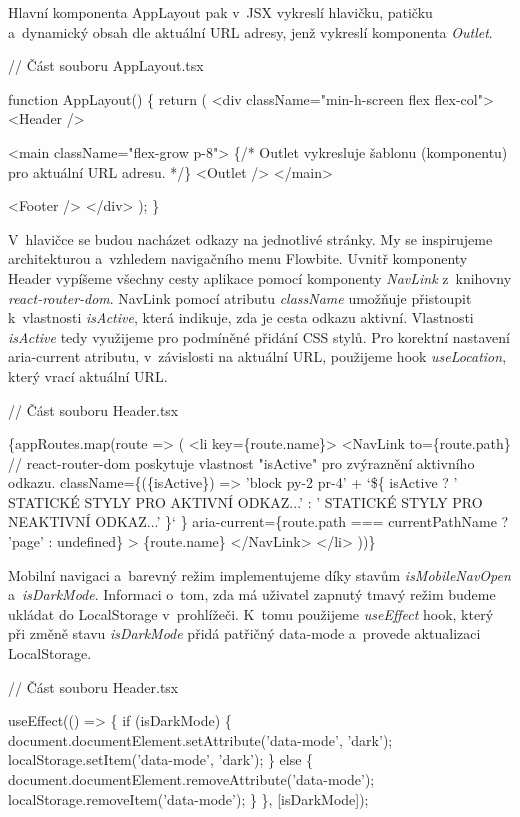 Hlavní komponenta AppLayout pak v~JSX vykreslí hlavičku, patičku a~dynamický obsah dle aktuální URL adresy, jenž vykreslí komponenta \emph{Outlet}.

\begin{prog}
// Část souboru AppLayout.tsx

function AppLayout() \{
  return (
    <div className="min-h-screen flex flex-col">
      <Header />

      <main className="flex-grow p-8">
        \{/* Outlet vykresluje šablonu (komponentu) pro aktuální URL adresu. */\}
        <Outlet />
      </main>

      <Footer />
    </div>
  );
\}
\end{prog}

V~hlavičce se budou nacházet odkazy na jednotlivé stránky. My se inspirujeme architekturou a~vzhledem navigačního menu Flowbite. 
Uvnitř komponenty Header vypíšeme všechny cesty aplikace pomocí komponenty \emph{NavLink} z~knihovny \emph{react-router-dom}. 
NavLink pomocí atributu \emph{className} umožňuje přistoupit k~vlastnosti \emph{isActive}, která indikuje, zda je cesta odkazu aktivní. 
Vlastnosti \emph{isActive} tedy využijeme pro podmíněné přidání CSS stylů. Pro korektní nastavení aria-current atributu, v~závislosti na aktuální URL, použijeme hook \emph{useLocation}, který vrací aktuální URL.

\begin{prog}
// Část souboru Header.tsx

\{appRoutes.map(route => (
  <li key=\{route.name\}>
    <NavLink
      to=\{route.path\}
      // react-router-dom poskytuje vlastnost "isActive"
        pro zvýraznění aktivního odkazu.
      className=\{(\{isActive\}) =>
        'block py-2 pr-4' +
        `\$\{
          isActive
            ? ' STATICKÉ STYLY PRO AKTIVNÍ ODKAZ...'
            : ' STATICKÉ STYLY PRO NEAKTIVNÍ ODKAZ...'
        \}`
      \}
      aria-current=\{route.path === currentPathName ? 'page' : undefined\}
    >
      \{route.name\}
    </NavLink>
  </li>
))\}
\end{prog}

Mobilní navigaci a~barevný režim implementujeme díky stavům \emph{isMobileNavOpen} a~\emph{isDarkMode}. Informaci o~tom, zda má uživatel zapnutý tmavý režim budeme ukládat do LocalStorage v~prohlížeči. 
K~tomu použijeme \emph{useEffect} hook, který při změně stavu \emph{isDarkMode} přidá patřičný data-mode a~provede aktualizaci LocalStorage.

\begin{prog}
// Část souboru Header.tsx

useEffect(() => \{
  if (isDarkMode) \{
    document.documentElement.setAttribute('data-mode', 'dark');
    localStorage.setItem('data-mode', 'dark');
  \} else \{
    document.documentElement.removeAttribute('data-mode');
    localStorage.removeItem('data-mode');
  \}
\}, [isDarkMode]);
\end{prog}